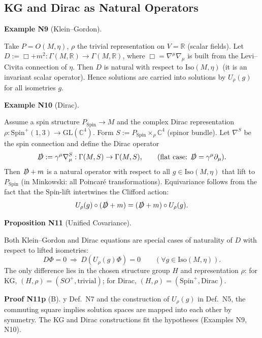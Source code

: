 \documentclass[10pt, letterpaper]{article}
\newcommand{\R}{\mathbb{R}}
\newcommand{\C}{\mathbb{C}}
\newcommand{\GL}{\mathrm{GL}}
\newcommand{\Spin}{\mathrm{Spin}}
\newcommand{\CustomHeading}[3]{%
  \par\medskip\noindent%
  \textbf{#1 #2} \textnormal{(#3)}.\enskip%
}
\newenvironment{PROP}[2]{\begin{unitbox}\CustomHeading{Proposition}{#1}{#2}}{\end{unitbox}}
\newenvironment{EXA}[2]{\begin{unitbox}\CustomHeading{Example}{#1}{#2}}{\end{unitbox}}
\newenvironment{PROOF}[2]{\begin{unitbox}\CustomHeading{Proof}{#1}{#2}}{\end{unitbox}}
\begin{document}
\subsection{KG and Dirac as Natural Operators}

\begin{EXA}{N9}{Klein--Gordon}
Take $P=O(M,\eta)$, $\rho$ the trivial representation on $V=\R$ (scalar fields).  
Let $D:=\Box + m^2:\Gamma(M,\R)\to\Gamma(M,\R)$, where $\Box=\nabla^\mu\nabla_\mu$ is built from the Levi--Civita connection of $\eta$.  
Then $D$ is natural with respect to $\mathrm{Iso}(M,\eta)$ (it is an invariant scalar operator).  
Hence solutions are carried into solutions by $U_\rho(g)$ for all isometries $g$.
\end{EXA}

\begin{EXA}{N10}{Dirac}
Assume a spin structure $P_{\Spin}\to M$ and the complex Dirac representation $\rho: \Spin^+(1,3)\to \GL(\C^4)$.  
Form $S:=P_{\Spin}\times_\rho \C^4$ (spinor bundle).  
Let $\nabla^S$ be the spin connection and define the Dirac operator
\[
\slashed D := \gamma^\mu \nabla^S_\mu : \Gamma(M,S)\to\Gamma(M,S),\qquad (\text{flat case: } \slashed D = \gamma^\mu\partial_\mu).
\]
Then $\slashed D+m$ is a natural operator with respect to all $g\in\mathrm{Iso}(M,\eta)$ that lift to $P_{\Spin}$ (in Minkowski: all Poincaré transformations).  
Equivariance follows from the fact that the $\Spin$-lift intertwines the Clifford action:
\[
U_\rho(g)\circ(\slashed D+m) = (\slashed D+m)\circ U_\rho(g).
\]
\end{EXA}

\begin{PROP}{N11}{Unified Covariance}
Both Klein--Gordon and Dirac equations are special cases of naturality of $D$ with respect to lifted isometries:  
\[
D\Phi=0 \ \Longrightarrow\ D(U_\rho(g)\Phi)=0\qquad (\forall g\in\mathrm{Iso}(M,\eta)).
\]
The only difference lies in the chosen structure group $H$ and representation $\rho$:  
for KG, $(H,\rho)=(SO^+, \text{trivial})$; for Dirac, $(H,\rho)=(\Spin^+, \text{Dirac})$.
\end{PROP}

\begin{PROOF}{N11p}
By Def.~N7 and the construction of $U_\rho(g)$ in Def.~N5, the commuting square implies solution spaces are mapped into each other by symmetry.  
The KG and Dirac constructions fit the hypotheses (Examples N9, N10).
\end{PROOF}
\end{document}
